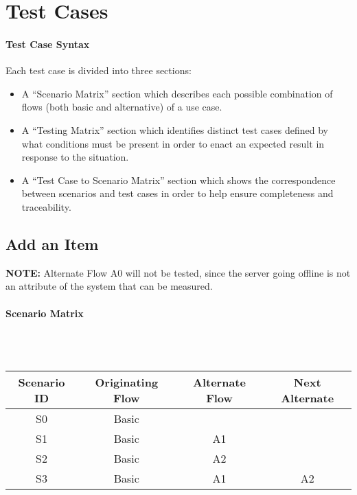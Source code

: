 \documentclass{article}
\begin{document}
\section{Test Cases}
\label{test_case}

\paragraph{Test Case Syntax}
Each test case is divided into three sections:
\begin{itemize}
\item A ``Scenario Matrix'' section which describes each possible combination of flows (both basic and alternative) of a use case.
\item A ``Testing Matrix'' section which identifies distinct test cases defined by what conditions must be present in order to enact an expected result in response to the situation.
\item A ``Test Case to Scenario Matrix'' section which shows the correspondence between scenarios and test cases in order to help ensure completeness and traceability.
\end{itemize}

\subsection{Add an Item}
\textbf{NOTE:} Alternate Flow A0 will not be tested, since the server going offline is not an attribute of the system that can be measured.\label{flow}

\paragraph{Scenario Matrix}~\\ \\
\begin{tabular}{ c  c  c  c }
\hline
Scenario ID & Originating Flow & Alternate Flow & Next Alternate\label{scenario}\\
\hline
\hline
S0 & Basic &  & \\
\hline
S1 & Basic & A1 & \\
\hline
S2 & Basic & A2 & \\
\hline
S3 & Basic & A1 & A2\\
\hline
\end{tabular}\\
~\\
~\\
\end{document}
